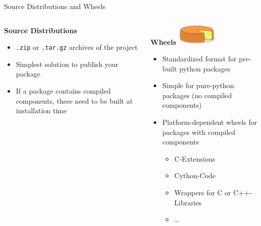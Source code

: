 \begin{frame}[c]{Source Distributions and Wheels}

  \begin{columns}[onlytextwidth, t]%
    \begin{column}{0.495\textwidth}%
      \textbf{\Large Source Distributions}
      \begin{itemize}
        \item \texttt{.zip} or \texttt{.tar.gz} archives of the project
        \item Simplest solution to publish your package
        \item If a package contains compiled components, these need to be built at installation time
      \end{itemize}
    \end{column}%
    \hfill%
    \begin{column}{0.495\textwidth}%
      \textbf{\Large Wheels} \includegraphics[height=1cm]{images/cheese.png}
      \begin{itemize}
        \item Standardized format for pre-built python packages
        \item Simple for pure-python packages (no compiled components)
        \item Platform-dependent wheels for packages with compiled components
          \begin{itemize}
            \item C-Extensions
            \item Cython-Code
            \item Wrappers for C or C++-Libraries
            \item \dots
          \end{itemize}
      \end{itemize}
    \end{column}%
  \end{columns}%
\end{frame}

